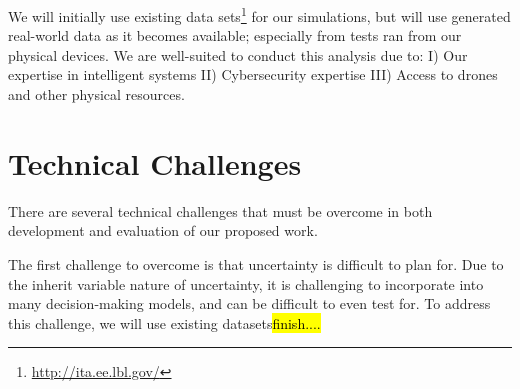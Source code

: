\documentclass{article}
\newcommand{\dan}[1]{\textcolor{blue}{{\it [Dan says: #1]}}}
\begin{document}
We will initially use existing data sets\footnote{\url{http://ita.ee.lbl.gov/}} for our simulations, but will use generated real-world data as it becomes available; especially from tests ran from our physical devices. We are well-suited to conduct this analysis due to: I) Our expertise in intelligent systems II) Cybersecurity expertise III) Access to drones and other physical resources.
    
       
       









\section{Technical Challenges}






There are several technical challenges that must be overcome in both development and evaluation of our proposed work.


The first challenge to overcome is that uncertainty is difficult to plan for. Due to the inherit variable nature of uncertainty, it is challenging to incorporate into many decision-making models, and can be difficult to even test for. To address this challenge, we will use existing datasets\hl{finish....}
\end{document}
